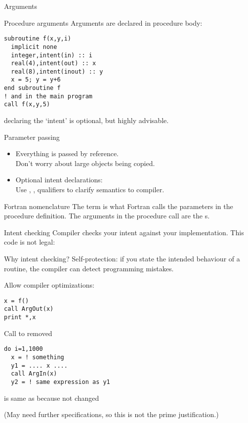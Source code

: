  {Arguments}

\begin{block}{Procedure arguments}
  \label{sl:farguments}
 Arguments are declared in procedure body:
\begin{lstlisting}
subroutine f(x,y,i)
  implicit none
  integer,intent(in) :: i
  real(4),intent(out) :: x
  real(8),intent(inout) :: y
  x = 5; y = y+6
end subroutine f
! and in the main program
call f(x,y,5)
\end{lstlisting}
declaring the `intent' is optional, but highly advisable.
\end{block}

\begin{block}{Parameter passing}
  \label{sl:fpassing}
  \begin{itemize}
  \item Everything is passed by reference.\\
    Don't worry about large objects being copied.
  \item Optional intent declarations:\\
    Use , ,  qualifiers to clarify semantics
    to compiler.
  \end{itemize}
\end{block}

\begin{block}{Fortran nomenclature}
  \label{sl:fortran-dummy}
  The term  is what Fortran calls the
  parameters in the procedure definition. The arguments in the
  procedure call are the s.
\end{block}

\begin{block}{Intent checking}
  \label{sl:fintent}
  Compiler checks your intent against your implementation. This code
  is not legal:

\end{block}

\begin{block}{Why intent checking?}
\label{sl:intentwhy}
Self-protection: if you state the intended behaviour of a routine, the
compiler can detect programming mistakes.

Allow compiler optimizations:

\begin{multicols}{2}
\begin{lstlisting}
x = f()
call ArgOut(x)
print *,x
\end{lstlisting}
Call to  removed
\vfill\columnbreak
\begin{lstlisting}
do i=1,1000
  x = ! something
  y1 = .... x ....
  call ArgIn(x)
  y2 = ! same expression as y1
\end{lstlisting}
 is same as  because  not changed
\end{multicols}
(May need further specifications, so this is not the prime justification.)
\end{block}

